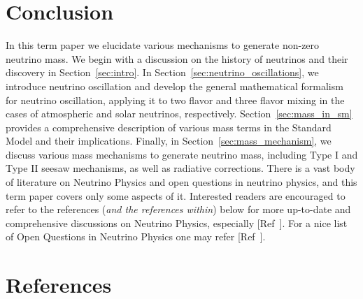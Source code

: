 \documentclass[%
aapm,
 rmp,
 amsmath,amssymb,
 reprint,%
]{revtex4-2}
\begin{document}
\section{Conclusion}
In this term paper we elucidate various mechanisms to generate non-zero neutrino mass. We begin with a discussion on the history of neutrinos and their discovery in Section~\ref{sec:intro}. In Section~\ref{sec:neutrino_oscillations}, we introduce neutrino oscillation and develop the general mathematical formalism for neutrino oscillation, applying it to two flavor and three flavor mixing in the cases of atmospheric and solar neutrinos, respectively. Section~\ref{sec:mass_in_sm} provides a comprehensive description of various mass terms in the Standard Model and their implications. Finally, in Section~\ref{sec:mass_mechanism}, we discuss various mass mechanisms to generate neutrino mass, including Type I and Type II seesaw mechanisms, as well as radiative corrections. There is a vast body of literature on Neutrino Physics and open questions in neutrino physics, and this term paper covers only some aspects of it. Interested readers are encouraged to refer to the references (\textit{and the references within}) below for more up-to-date and comprehensive discussions on Neutrino Physics, especially [Ref~]. For a nice list of Open Questions in Neutrino Physics one may refer [Ref~]. 


\section*{References}
\onecolumngrid
\appendix

\end{document}
